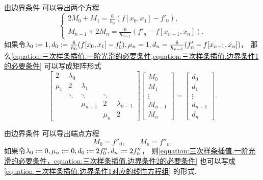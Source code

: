 由边界条件  可以导出两个方程\begin{equation}\label{equation:三次样条插值.边界条件1的必要条件}
	\begin{cases}
		2 M_0 + M_1 = \frac{6}{h_0} ( f[x_0,x_1] - f'_0 ), \\
		M_{n-1} + 2 M_n = \frac{6}{h_{n-1}} ( f'_n - f[x_{n-1},x_n] ).
	\end{cases}
\end{equation}
如果令\(
	\lambda_0 := 1,
	d_0 := \frac{6}{h_0} (f[x_0,x_1] - f'_0),
	\mu_n = 1,
	d_n = \frac{6}{h_{n-1}} (f'_n - f[x_{n-1},x_n])
\)，
那么\cref{equation:三次样条插值.一阶光滑的必要条件,equation:三次样条插值.边界条件1的必要条件}
可以写成矩阵形式\begin{equation}\label{equation:三次样条插值.边界条件1对应的线性方程组}
	\begin{bmatrix}
		2 & \lambda_0 \\
		\mu_1 & 2 & \lambda_1 \\
		& \ddots & \ddots & \ddots \\
		&& \mu_{n-1} & 2 & \lambda_{n-1} \\
		&&& \mu_n & 2
	\end{bmatrix}
	\begin{bmatrix}
		M_0 \\ M_1 \\ \vdots \\ M_{n-1} \\ M_n
	\end{bmatrix}
	= \begin{bmatrix}
		d_0 \\ d_1 \\ \vdots \\ d_{n-1} \\ d_n
	\end{bmatrix}.
\end{equation}

由边界条件  可以导出端点方程\begin{equation}\label{equation:三次样条插值.边界条件2的必要条件}
	M_0 = f''_0,
	\qquad
	M_n = f''_n.
\end{equation}
如果令\(
	\lambda_0 := 0,
	\mu_n := 0,
	d_0 := 2 f''_0,
	d_n := 2 f''_n
\)，
则\cref{equation:三次样条插值.一阶光滑的必要条件，equation:三次样条插值.边界条件2的必要条件}
也可以写成\cref{equation:三次样条插值.边界条件1对应的线性方程组} 的形式.

